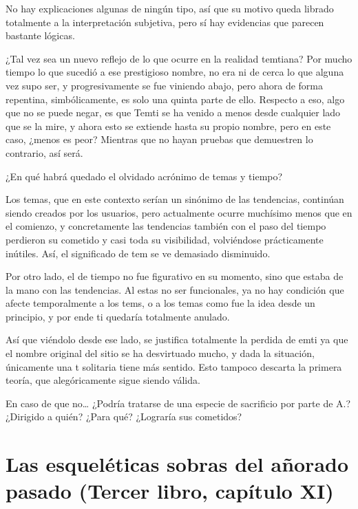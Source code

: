 \documentclass[
  spanish,
]{book}
\begin{document}
No hay explicaciones algunas de ningún tipo, así que su motivo queda librado totalmente a la interpretación subjetiva, pero sí hay evidencias que parecen bastante lógicas.

¿Tal vez sea un nuevo reflejo de lo que ocurre en la realidad temtiana? Por mucho tiempo lo que sucedió a ese prestigioso nombre, no era ni de cerca lo que alguna vez supo ser, y progresivamente se fue viniendo abajo, pero ahora de forma repentina, simbólicamente, es solo una quinta parte de ello. Respecto a eso, algo que no se puede negar, es que Temti se ha venido a menos desde cualquier lado que se la mire, y ahora esto se extiende hasta su propio nombre, pero en este caso, ¿menos es peor? Mientras que no hayan pruebas que demuestren lo contrario, así será.

¿En qué habrá quedado el olvidado acrónimo de temas y tiempo?

Los temas, que en este contexto serían un sinónimo de las tendencias, continúan siendo creados por los usuarios, pero actualmente ocurre muchísimo menos que en el comienzo, y concretamente las tendencias también con el paso del tiempo perdieron su cometido y casi toda su visibilidad, volviéndose prácticamente inútiles. Así, el significado de tem se ve demasiado disminuido.

Por otro lado, el de tiempo no fue figurativo en su momento, sino que estaba de la mano con las tendencias. Al estas no ser funcionales, ya no hay condición que afecte temporalmente a los tems, o a los temas como fue la idea desde un principio, y por ende ti quedaría totalmente anulado.

Así que viéndolo desde ese lado, se justifica totalmente la perdida de emti ya que el nombre original del sitio se ha desvirtuado mucho, y dada la situación, únicamente una t solitaria tiene más sentido. Esto tampoco descarta la primera teoría, que alegóricamente sigue siendo válida.

En caso de que no\ldots{} ¿Podría tratarse de una especie de sacrificio por parte de A.? ¿Dirigido a quién? ¿Para qué? ¿Lograría sus cometidos?

\hypertarget{las-esqueluxe9ticas-sobras-del-auxf1orado-pasado-tercer-libro-capuxedtulo-xi}{%
\section{Las esqueléticas sobras del añorado pasado (Tercer libro, capítulo XI)}\label{las-esqueluxe9ticas-sobras-del-auxf1orado-pasado-tercer-libro-capuxedtulo-xi}}
\end{document}
